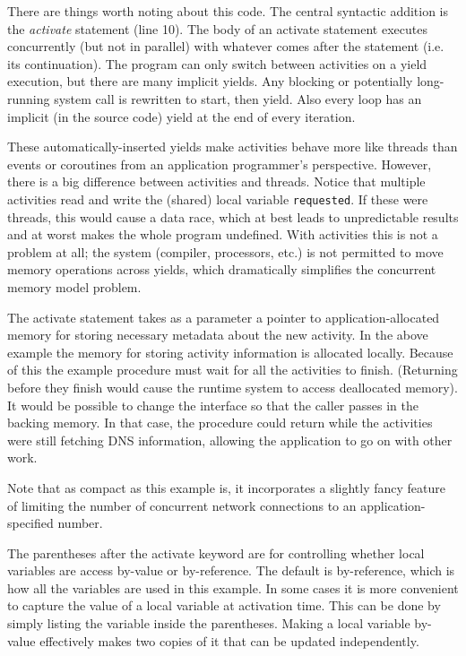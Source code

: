 \documentclass[10pt,preprint]{sigplanconf}
\begin{document}
There are things worth noting about this code.
The central syntactic addition is the \emph{activate} statement (line 10).
The body of an activate statement executes concurrently (but not in parallel) with whatever comes after the statement (i.e. its continuation).
The program can only switch between activities on a yield execution, but there are many implicit yields.
Any blocking or potentially long-running system call is rewritten to start, then yield.
Also every loop has an implicit (in the source code) yield at the end of every iteration.

These automatically-inserted yields make activities behave more like threads than events or coroutines from an application programmer's perspective.
However, there is a big difference between activities and threads.
Notice that multiple activities read and write the (shared) local variable \texttt{requested}.
If these were threads, this would cause a data race, which at best leads to unpredictable results and at worst makes the whole program undefined.
With activities this is not a problem at all; the system (compiler, processors, etc.) is not permitted to move memory operations across yields, which dramatically simplifies the concurrent memory model problem.

The activate statement takes as a parameter a pointer to application-allocated memory for storing necessary metadata about the new activity.
In the above example the memory for storing activity information is allocated locally.
Because of this the example procedure must wait for all the activities to finish.
(Returning before they finish would cause the runtime system to access deallocated memory).
It would be possible to change the interface so that the caller passes in the backing memory.
In that case, the procedure could return while the activities were still fetching DNS information, allowing the application to go on with other work.

Note that as compact as this example is, it incorporates a slightly fancy feature of limiting the number of concurrent network connections to an application-specified number.

The parentheses after the activate keyword are for controlling whether local variables are access by-value or by-reference.
The default is by-reference, which is how all the variables are used in this example.
In some cases it is more convenient to capture the value of a local variable at activation time.
This can be done by simply listing the variable inside the parentheses.
Making a local variable by-value effectively makes two copies of it that can be updated independently.
\end{document}
